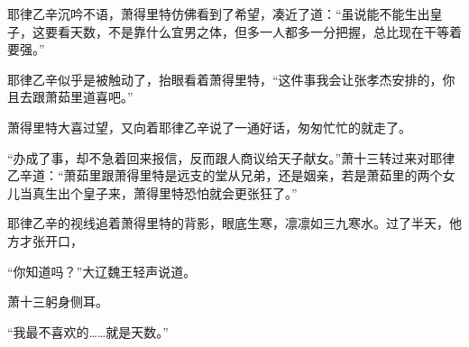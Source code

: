 耶律乙辛沉吟不语，萧得里特仿佛看到了希望，凑近了道：“虽说能不能生出皇子，这要看天数，不是靠什么宜男之体，但多一人都多一分把握，总比现在干等着要强。”

耶律乙辛似乎是被触动了，抬眼看着萧得里特，“这件事我会让张孝杰安排的，你且去跟萧茹里道喜吧。”

萧得里特大喜过望，又向着耶律乙辛说了一通好话，匆匆忙忙的就走了。

“办成了事，却不急着回来报信，反而跟人商议给天子献女。”萧十三转过来对耶律乙辛道：“萧茹里跟萧得里特是远支的堂从兄弟，还是姻亲，若是萧茹里的两个女儿当真生出个皇子来，萧得里特恐怕就会更张狂了。”

耶律乙辛的视线追着萧得里特的背影，眼底生寒，凛凛如三九寒水。过了半天，他方才张开口，

“你知道吗？”大辽魏王轻声说道。

萧十三躬身侧耳。

“我最不喜欢的……就是天数。”

